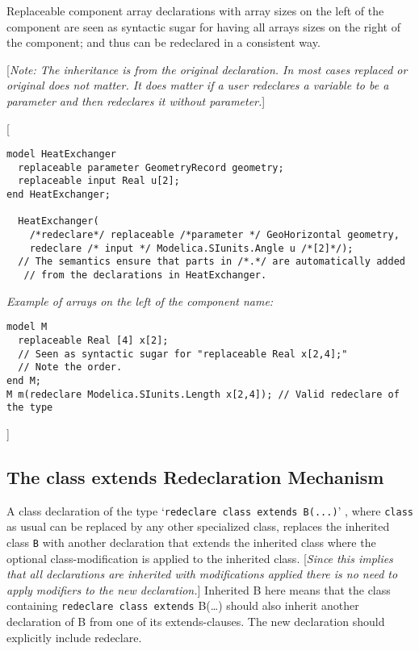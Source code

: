 Replaceable component array declarations with array sizes on the left of
the component are seen as syntactic sugar for having all arrays sizes on
the right of the component; and thus can be redeclared in a consistent
way.

{[}\emph{Note: The inheritance is from the original declaration. In most
cases replaced or original does not matter. It does matter if a user
redeclares a variable to be a parameter and then redeclares it without
parameter.}{]}

{[}
\begin{lstlisting}[language=modelica]
model HeatExchanger
  replaceable parameter GeometryRecord geometry;
  replaceable input Real u[2];
end HeatExchanger;

  HeatExchanger(
    /*redeclare*/ replaceable /*parameter */ GeoHorizontal geometry,
    redeclare /* input */ Modelica.SIunits.Angle u /*[2]*/);
  // The semantics ensure that parts in /*.*/ are automatically added
   // from the declarations in HeatExchanger.
\end{lstlisting}

\emph{Example of arrays on the left of the component name:}
\begin{lstlisting}[language=modelica]
model M
  replaceable Real [4] x[2];
  // Seen as syntactic sugar for "replaceable Real x[2,4];"
  // Note the order.
end M;
M m(redeclare Modelica.SIunits.Length x[2,4]); // Valid redeclare of the type
\end{lstlisting}

{]}

\subsection{The class extends Redeclaration Mechanism}

A class declaration of the type `\lstinline[basicstyle=\ttfamily]!redeclare class extends B(...)!' ,
where \lstinline[basicstyle=\ttfamily]!class! as usual can be replaced by any other specialized class,
replaces the inherited class \lstinline[basicstyle=\ttfamily]!B! with another declaration that extends the
inherited class where the optional class-modification is applied to the
inherited class. {[}\emph{Since this implies that all declarations are
inherited with modifications applied there is no need to apply modifiers
to the new declaration.}{]} Inherited B here means that the class
containing \lstinline[basicstyle=\ttfamily]!redeclare class extends! B(\ldots{}) should also inherit
another declaration of B from one of its extends-clauses. The new
declaration should explicitly include redeclare.

